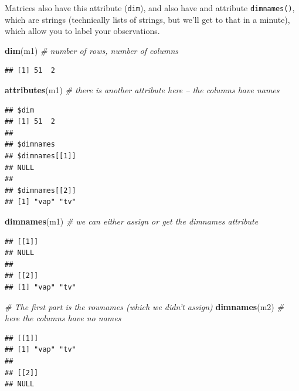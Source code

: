 \documentclass[]{article}
\newenvironment{Shaded}{\begin{snugshade}}{\end{snugshade}}
\newcommand{\KeywordTok}[1]{\textcolor[rgb]{0.13,0.29,0.53}{\textbf{#1}}}
\newcommand{\CommentTok}[1]{\textcolor[rgb]{0.56,0.35,0.01}{\textit{#1}}}
\newcommand{\NormalTok}[1]{#1}
\begin{document}
Matrices also have this attribute (\texttt{dim}), and also have and
attribute \texttt{dimnames()}, which are strings (technically lists of
strings, but we'll get to that in a minute), which allow you to label
your observations.

\begin{Shaded}
\begin{Highlighting}[]
\KeywordTok{dim}\NormalTok{(m1) }\CommentTok{# number of rows, number of columns}
\end{Highlighting}
\end{Shaded}

\begin{verbatim}
## [1] 51  2
\end{verbatim}

\begin{Shaded}
\begin{Highlighting}[]
\KeywordTok{attributes}\NormalTok{(m1) }\CommentTok{# there is another attribute here -- the columns have names}
\end{Highlighting}
\end{Shaded}

\begin{verbatim}
## $dim
## [1] 51  2
## 
## $dimnames
## $dimnames[[1]]
## NULL
## 
## $dimnames[[2]]
## [1] "vap" "tv"
\end{verbatim}

\begin{Shaded}
\begin{Highlighting}[]
\KeywordTok{dimnames}\NormalTok{(m1) }\CommentTok{# we can either assign or get the dimnames attribute}
\end{Highlighting}
\end{Shaded}

\begin{verbatim}
## [[1]]
## NULL
## 
## [[2]]
## [1] "vap" "tv"
\end{verbatim}

\begin{Shaded}
\begin{Highlighting}[]
\CommentTok{# The first part is the rownames (which we didn't assign)}
\KeywordTok{dimnames}\NormalTok{(m2) }\CommentTok{# here the columns have no names}
\end{Highlighting}
\end{Shaded}

\begin{verbatim}
## [[1]]
## [1] "vap" "tv" 
## 
## [[2]]
## NULL
\end{verbatim}
\end{document}
